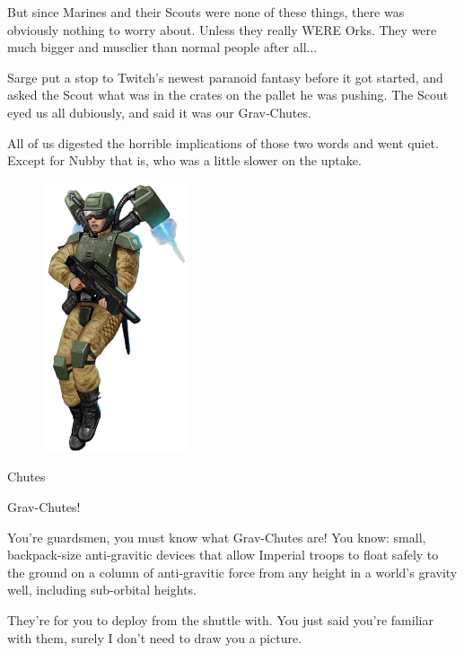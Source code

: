 But since Marines and their Scouts were none of these things, there was obviously nothing to worry about. 
Unless they really WERE Orks. 
They were much bigger and musclier than normal people after all...

Sarge put a stop to Twitch's newest paranoid fantasy before it got started, and asked the Scout what was in the crates on the pallet he was pushing. 
The Scout eyed us all dubiously, and said it was our Grav-Chutes.

All of us digested the horrible implications of those two words and went quiet. 
Except for Nubby that is, who was a little slower on the uptake.
\begin{figure}
	\begin{center}
		\includegraphics[width=\figwidth]{pics/12/24.png}
	\end{center}
\end{figure}


Chutes



Grav-Chutes!



You're guardsmen, you must know what Grav-Chutes are! 
You know: 
small, backpack-size anti-gravitic devices that allow Imperial troops to float safely to the ground on a column of anti-gravitic force from any height in a world's gravity well, including sub-orbital heights.



They're for you to deploy from the shuttle with. 
You just said you're familiar with them, surely I don't need to draw you a picture.

